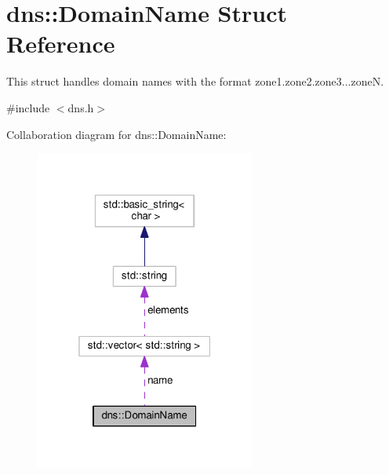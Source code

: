 \hypertarget{structdns_1_1DomainName}{}\section{dns\+:\+:Domain\+Name Struct Reference}
\label{structdns_1_1DomainName}


This struct handles domain names with the format \textquotesingle{}zone1.\+zone2.\+zone3...zoneN\textquotesingle{}.  




{\ttfamily \#include $<$dns.\+h$>$}



Collaboration diagram for dns\+:\+:Domain\+Name\+:\nopagebreak
\begin{figure}[H]
\begin{center}
\leavevmode
\includegraphics[width=205pt]{structdns_1_1DomainName__coll__graph}
\end{center}
\end{figure}
